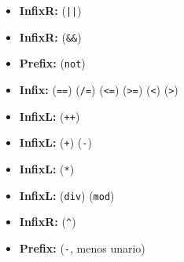 \documentclass{article}
\begin{document}
\begin{itemize}
\item {\bf InfixR:}  (\texttt{||})
\item {\bf InfixR:}  (\texttt{\&\&})
\item {\bf Prefix:}  (\texttt{not})
\item {\bf Infix:}
   (\texttt{==})
   (\texttt{/=})
   (\texttt{<=})
   (\texttt{>=})
   (\texttt{<})
   (\texttt{>})
\item {\bf InfixL:}
   (\texttt{++})
\item {\bf InfixL:}
   (\texttt{+})
   (\texttt{-})
\item {\bf InfixL:}
   (\texttt{*})
\item {\bf InfixL:}
   (\texttt{div})
   (\texttt{mod})
\item {\bf InfixR:}
   (\texttt{\^})
\item {\bf Prefix:}
   (\texttt{-}, menos unario)
\end{itemize}
\end{document}
